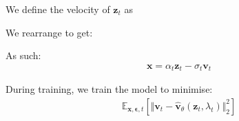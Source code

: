 \documentclass[ oneside,%
                    author={George Herbert},
                    degree={MSci},
                     title={Diffusion Models for Time-Evolving Precipitation Fields},
                  subtitle={}]{dissertation}
\begin{document}
We define the velocity of $\mathbf{z}_t$ as 

We rearrange to get:

As such:
\begin{align}
      \mathbf{x}=\alpha_t\mathbf{z}_t-\sigma_t\mathbf{v}_t
\end{align}

During training, we train the model to minimise:
\begin{align}
      \mathbb{E}_{\mathbf{x},\boldsymbol\epsilon, t}\left[\Vert\mathbf{v}_t-\hat{\mathbf{v}}_\theta(\mathbf{z}_t, \lambda_t)\Vert_2^2\right]
\end{align}

\end{document}
